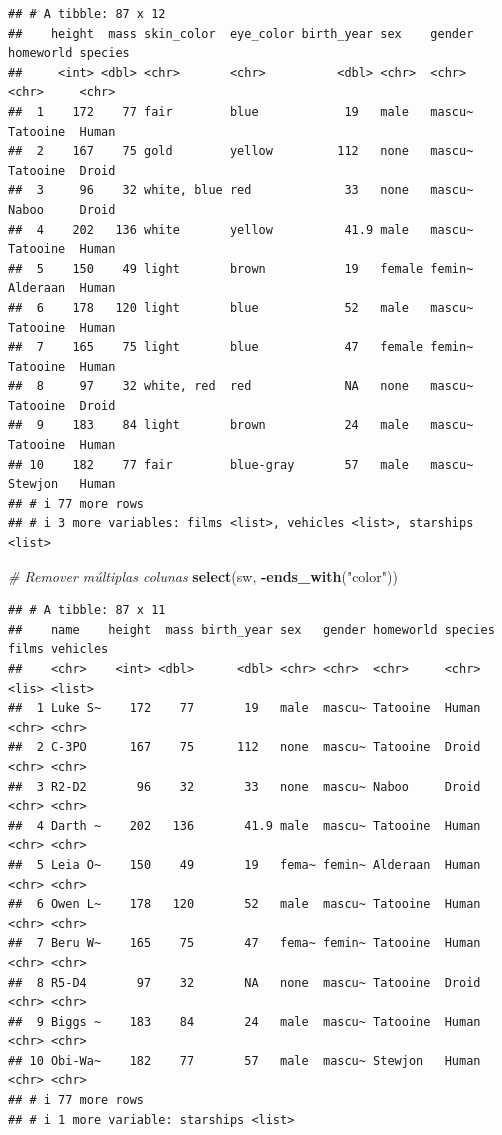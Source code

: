 \documentclass[
]{book}
\newenvironment{Shaded}{\begin{snugshade}}{\end{snugshade}}
\newcommand{\CommentTok}[1]{\textcolor[rgb]{0.56,0.35,0.01}{\textit{#1}}}
\newcommand{\FunctionTok}[1]{\textcolor[rgb]{0.13,0.29,0.53}{\textbf{#1}}}
\newcommand{\NormalTok}[1]{#1}
\newcommand{\SpecialCharTok}[1]{\textcolor[rgb]{0.81,0.36,0.00}{\textbf{#1}}}
\newcommand{\StringTok}[1]{\textcolor[rgb]{0.31,0.60,0.02}{#1}}
\begin{document}
\begin{verbatim}
## # A tibble: 87 x 12
##    height  mass skin_color  eye_color birth_year sex    gender homeworld species
##     <int> <dbl> <chr>       <chr>          <dbl> <chr>  <chr>  <chr>     <chr>  
##  1    172    77 fair        blue            19   male   mascu~ Tatooine  Human  
##  2    167    75 gold        yellow         112   none   mascu~ Tatooine  Droid  
##  3     96    32 white, blue red             33   none   mascu~ Naboo     Droid  
##  4    202   136 white       yellow          41.9 male   mascu~ Tatooine  Human  
##  5    150    49 light       brown           19   female femin~ Alderaan  Human  
##  6    178   120 light       blue            52   male   mascu~ Tatooine  Human  
##  7    165    75 light       blue            47   female femin~ Tatooine  Human  
##  8     97    32 white, red  red             NA   none   mascu~ Tatooine  Droid  
##  9    183    84 light       brown           24   male   mascu~ Tatooine  Human  
## 10    182    77 fair        blue-gray       57   male   mascu~ Stewjon   Human  
## # i 77 more rows
## # i 3 more variables: films <list>, vehicles <list>, starships <list>
\end{verbatim}

\begin{Shaded}
\begin{Highlighting}[]
\CommentTok{\# Remover múltiplas colunas}
\FunctionTok{select}\NormalTok{(sw, }\SpecialCharTok{{-}}\FunctionTok{ends\_with}\NormalTok{(}\StringTok{"color"}\NormalTok{))}
\end{Highlighting}
\end{Shaded}

\begin{verbatim}
## # A tibble: 87 x 11
##    name    height  mass birth_year sex   gender homeworld species films vehicles
##    <chr>    <int> <dbl>      <dbl> <chr> <chr>  <chr>     <chr>   <lis> <list>  
##  1 Luke S~    172    77       19   male  mascu~ Tatooine  Human   <chr> <chr>   
##  2 C-3PO      167    75      112   none  mascu~ Tatooine  Droid   <chr> <chr>   
##  3 R2-D2       96    32       33   none  mascu~ Naboo     Droid   <chr> <chr>   
##  4 Darth ~    202   136       41.9 male  mascu~ Tatooine  Human   <chr> <chr>   
##  5 Leia O~    150    49       19   fema~ femin~ Alderaan  Human   <chr> <chr>   
##  6 Owen L~    178   120       52   male  mascu~ Tatooine  Human   <chr> <chr>   
##  7 Beru W~    165    75       47   fema~ femin~ Tatooine  Human   <chr> <chr>   
##  8 R5-D4       97    32       NA   none  mascu~ Tatooine  Droid   <chr> <chr>   
##  9 Biggs ~    183    84       24   male  mascu~ Tatooine  Human   <chr> <chr>   
## 10 Obi-Wa~    182    77       57   male  mascu~ Stewjon   Human   <chr> <chr>   
## # i 77 more rows
## # i 1 more variable: starships <list>
\end{verbatim}
\end{document}

